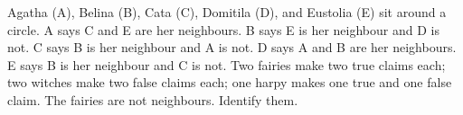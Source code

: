 Agatha (A), Belina (B), Cata (C), Domitila (D), and Eustolia (E) sit around a circle. A says C and E are her neighbours. B says E is her neighbour and D is not. C says B is her neighbour and A is not. D says A and B are her neighbours. E says B is her neighbour and C is not. Two fairies make two true claims each; two witches make two false claims each; one harpy makes one true and one false claim. The fairies are not neighbours. Identify them.
